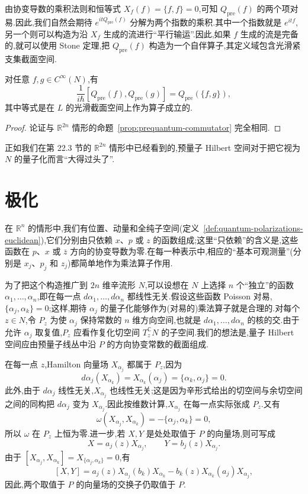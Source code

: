 由协变导数的乘积法则和恒等式 $X_f(f)=\{f,f\}=0$,可知 $Q_{\mathrm{pre}}(f)$ 的两个项对易.因此,我们自然会期待 $e^{itQ_{\mathrm{pre}}(f)}$ 分解为两个指数的乘积.其中一个指数就是 $e^{itf}$,另一个则可以构造为沿 $X_f$ 生成的流进行“平行输运”.因此,如果 $f$ 生成的流是完备的,就可以使用 Stone 定理,把 $Q_{\mathrm{pre}}(f)$ 构造为一个自伴算子,其定义域包含光滑紧支集截面空间.

\begin{proposition}[流形上的预量子交换关系]
\label{prop:prequantum-manifold-commutator}
对任意 $f,g\in C^\infty(N)$,有
\[
 \frac1{i\hbar}[Q_{\mathrm{pre}}(f),Q_{\mathrm{pre}}(g)]
 =Q_{\mathrm{pre}}(\{f,g\}),
 \label{eq:manifold-prequantum-commutator}
\]
其中等式是在 $L$ 的光滑截面空间上作为算子成立的.
\end{proposition}

\begin{proof}
论证与 $\mathbb R^{2n}$ 情形的命题~\ref{prop:prequantum-commutator} 完全相同.
\end{proof}

正如我们在第 22.3 节的 $\mathbb R^{2n}$ 情形中已经看到的,预量子 Hilbert 空间对于把它视为 $N$ 的量子化而言“大得过头了”.

\section{极化}
\label{sec:polarizations}

在 $\mathbb R^n$ 的情形中,我们有位置、动量和全纯子空间(定义~\ref{def:quantum-polarizations-euclidean}),它们分别由只依赖 $x$、$p$ 或 $z$ 的函数组成;这里“只依赖”的含义是,这些函数在 $p$、$x$ 或 $\bar z$ 方向的协变导数为零.在每一种表示中,相应的“基本可观测量”(分别是 $x_j$、$p_j$ 和 $z_j$)都简单地作为乘法算子作用.

为了把这个构造推广到 $2n$ 维辛流形 $N$,可以设想在 $N$ 上选择 $n$ 个“独立”的函数 $\alpha_1,\ldots,\alpha_n$,即在每一点 $d\alpha_1,\ldots,d\alpha_n$ 都线性无关.假设这些函数 Poisson 对易,$\{\alpha_j,\alpha_k\}=0$;这样,期待 $\alpha_j$ 的量子化能够作为(对易的)乘法算子就是合理的.对每个 $z\in N$,令 $P_z$ 为使 $\alpha_j$ 保持常数的 $n$ 维方向空间,也就是 $d\alpha_1,\ldots,d\alpha_n$ 的核的交.由于允许 $\alpha_j$ 取复值,$P_z$ 应看作复化切空间 $T_z^{\mathbb C} N$ 的子空间.我们的想法是,量子 Hilbert 空间应由预量子线丛中沿 $P$ 的方向协变常数的截面组成.

在每一点 $z$,Hamilton 向量场 $X_{\alpha_j}$ 都属于 $P_z$,因为
\[
 d\alpha_j(X_{\alpha_k})=X_{\alpha_k}(\alpha_j)=\{\alpha_k,\alpha_j\}=0.
\]
此外,由于 $d\alpha_j$ 线性无关,$X_{\alpha_j}$ 也线性无关;这是因为辛形式给出的切空间与余切空间之间的同构把 $d\alpha_j$ 变为 $X_{\alpha_j}$.因此按维数计算,$X_{\alpha_j}$ 在每一点实际张成 $P_z$.又有
\[
 \omega(X_{\alpha_j},X_{\alpha_k})=-\{\alpha_j,\alpha_k\}=0,
\]
所以 $\omega$ 在 $P_z$ 上恒为零.进一步,若 $X,Y$ 是处处取值于 $P$ 的向量场,则可写成
\[
 X=a_j(z)X_{\alpha_j},\qquad Y=b_j(z)X_{\alpha_j}.
\]
由于 $[X_{\alpha_j},X_{\alpha_k}]=X_{\{\alpha_j,\alpha_k\}}=0$,有
\[
 [X,Y]=a_j(z)X_{\alpha_j}(b_k)X_{\alpha_k}
 -b_k(z)X_{\alpha_k}(a_j)X_{\alpha_j},
\]
因此,两个取值于 $P$ 的向量场的交换子仍取值于 $P$.

